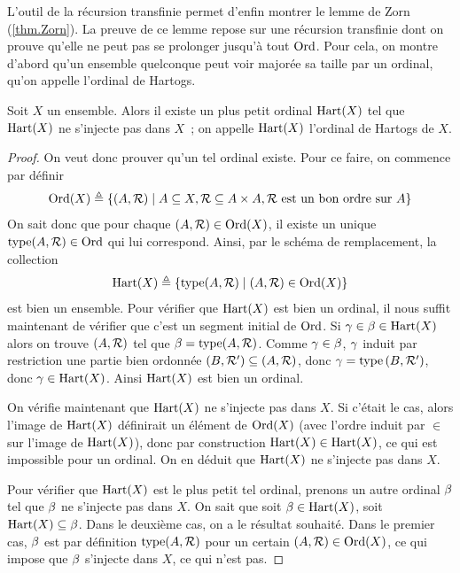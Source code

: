 L'outil de la récursion transfinie permet d'enfin montrer le lemme de Zorn
(\cref{thm.Zorn}). La preuve de ce lemme repose sur une récursion transfinie
dont on prouve qu'elle ne peut pas se prolonger jusqu'à tout $\operatorname{Ord}$. Pour cela,
on montre d'abord qu'un ensemble quelconque peut voir majorée sa taille par un
ordinal, qu'on appelle l'ordinal de Hartogs.

\begin{definition}
  Soit $X$ un ensemble. Alors il existe un plus petit ordinal $\operatorname{Hart}(X)$ tel
  que $\operatorname{Hart}(X)$ ne s'injecte pas dans $X$~; on appelle $\operatorname{Hart}(X)$ l'ordinal
  de Hartogs de $X$.
\end{definition}

\begin{proof}
  On veut donc prouver qu'un tel ordinal existe. Pour ce faire, on commence par
  définir
  \[\operatorname{Ord}(X) \triangleq
  \left\{ (A,\mathord{\mathrel{\mathcal{R}}}) \;\middle\vert\; A\subseteq X, \mathord{\mathrel{\mathcal{R}}}\subseteq A\times A,
          \mathord{\mathrel{\mathcal{R}}}\text{ est un bon ordre sur }A \right\}\]
  On sait donc que pour chaque $(A,\mathord{\mathrel{\mathcal{R}}})\in\operatorname{Ord}(X)$, il existe
  un unique $\operatorname{type}(A,\mathord{\mathrel{\mathcal{R}}})\in\operatorname{Ord}$ qui lui correspond. Ainsi,
  par le schéma de remplacement, la collection
  \[\operatorname{Hart}(X) \triangleq
  \left\{ \operatorname{type}(A,\mathord{\mathrel{\mathcal{R}}}) \;\middle\vert\; (A,\mathord{\mathrel{\mathcal{R}}}) \in \operatorname{Ord}(X) \right\}\]
  est bien un ensemble. Pour vérifier que $\operatorname{Hart}(X)$ est bien un ordinal, il
  nous suffit maintenant de vérifier que c'est un segment initial de $\operatorname{Ord}$.
  Si $\gamma\in\beta\in\operatorname{Hart}(X)$ alors on trouve $(A,\mathord{\mathrel{\mathcal{R}}})$
  tel que $\beta = \operatorname{type}(A,\mathord{\mathrel{\mathcal{R}}})$. Comme $\gamma\in\beta$,
  $\gamma$ induit par restriction une partie bien ordonnée
  $(B,\mathord{\mathrel{\mathcal{R}}'})\subseteq (A,\mathord{\mathrel{\mathcal{R}}})$, donc
  $\gamma = \operatorname{type}{(B,\mathord{\mathrel{\mathcal{R}}'})}$, donc
  $\gamma\in \operatorname{Hart}(X)$. Ainsi $\operatorname{Hart}(X)$ est bien un ordinal.

  On vérifie maintenant que $\operatorname{Hart}(X)$ ne s'injecte pas dans $X$. Si c'était le
  cas, alors l'image de $\operatorname{Hart}(X)$ définirait un élément de $\operatorname{Ord}(X)$ (avec
  l'ordre induit par $\in$ sur l'image de $\operatorname{Hart}(X)$), donc par construction
  $\operatorname{Hart}(X)\in\operatorname{Hart}(X)$, ce qui est impossible pour un ordinal. On en déduit
  que $\operatorname{Hart}(X)$ ne s'injecte pas dans $X$.

  Pour vérifier que $\operatorname{Hart}(X)$ est le plus petit tel ordinal, prenons un autre
  ordinal $\beta$ tel que $\beta$ ne s'injecte pas dans $X$. On sait que
  soit $\beta \in \operatorname{Hart}(X)$, soit $\operatorname{Hart}(X)\subseteq \beta$. Dans le deuxième
  cas, on a le résultat souhaité. Dans le premier cas, $\beta$ est par
  définition $\operatorname{type}(A,\mathord{\mathrel{\mathcal{R}}})$ pour un certain
  $(A,\mathord{\mathrel{\mathcal{R}}})\in\operatorname{Ord}(X)$, ce qui impose que $\beta$ s'injecte
  dans $X$, ce qui n'est pas.
\end{proof}

